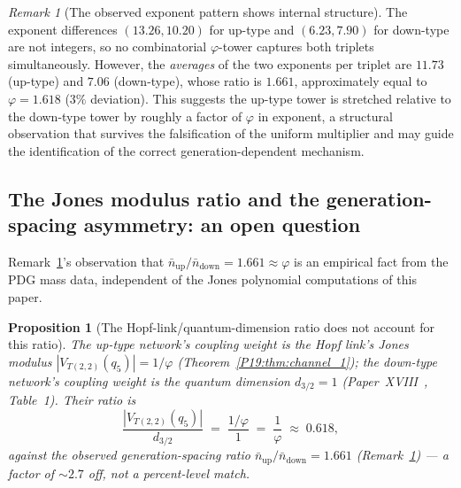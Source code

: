 \documentclass[11pt,a4paper]{article}
\newtheorem{proposition}[theorem]{Proposition}
\theoremstyle{definition}\newtheorem{definition}[theorem]{Definition}
\theoremstyle{remark}
\newtheorem{remark}[theorem]{Remark}
\newcommand{\vp}{\varphi}
\newcommand{\dimq}[1]{d_{#1}}
\newcommand{\Jones}{V}
\begin{document}
\begin{remark}[The observed exponent pattern shows internal structure]
\label{P19:rem:tower_structure}
The exponent differences $(13.26,10.20)$ for up-type and
$(6.23,7.90)$ for down-type are not integers, so no combinatorial
$\vp$-tower captures both triplets simultaneously.  However, the
\emph{averages} of the two exponents per triplet are $11.73$
(up-type) and $7.06$ (down-type), whose ratio is $1.661$,
approximately equal to $\vp=1.618$ ($3\%$ deviation).  This
suggests the up-type tower is stretched relative to the down-type
tower by roughly a factor of $\vp$ in exponent, a structural
observation that survives the falsification of the uniform
multiplier and may guide the identification of the correct
generation-dependent mechanism.
\end{remark}

\subsection{The Jones modulus ratio and the generation-spacing asymmetry: an open question}

Remark~\ref{P19:rem:tower_structure}'s observation that
$\bar n_{\mathrm{up}}/\bar n_{\mathrm{down}}=1.661\approx\vp$ is an
empirical fact from the PDG mass data, independent of the Jones
polynomial computations of this paper.

\begin{proposition}[The Hopf-link/quantum-dimension ratio does not account for this ratio]
\label{P19:prop:jones_modulus_ratio}
The up-type network's coupling weight is the Hopf link's Jones
modulus $|\Jones_{T(2,2)}(q_5)|=1/\vp$ (Theorem~\ref{P19:thm:channel_1});
the down-type network's coupling weight is the quantum dimension
$\dimq{3/2}=1$ (Paper~XVIII~\cite{Paper18}, Table~1). %
Their ratio is
\begin{equation}
  \frac{|\Jones_{T(2,2)}(q_5)|}{\dimq{3/2}}
  \;=\; \frac{1/\vp}{1} \;=\; \frac{1}{\vp} \;\approx\; 0.618,
  \label{P19:eq:jones_modulus_ratio}
\end{equation}
against the observed generation-spacing ratio
$\bar n_{\mathrm{up}}/\bar n_{\mathrm{down}}=1.661$
(Remark~\ref{P19:rem:tower_structure}) --- a factor of $\sim2.7$ off,
not a percent-level match.
\end{proposition}
\end{document}
